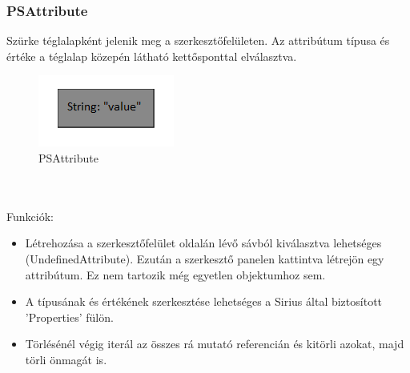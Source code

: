 \subsubsection{PSAttribute}
Szürke téglalapként jelenik meg a szerkesztőfelületen. Az attribútum típusa és értéke a téglalap közepén látható kettősponttal elválasztva.
\begin{figure}[!ht]
	\centering
	\includegraphics{figures/attr.PNG}
	\caption{PSAttribute}
	\label{attr} 
\end{figure}
\\\\
Funkciók:
\begin{itemize}  	
	\item Létrehozása a szerkesztőfelület oldalán lévő sávból kiválasztva lehetséges (UndefinedAttribute). Ezután a szerkesztő panelen kattintva létrejön egy attribútum. Ez nem tartozik még egyetlen objektumhoz sem.
	
	\item A típusának és értékének szerkesztése lehetséges a Sirius által biztosított 'Properties' fülön.
	
	\item Törlésénél végig iterál az összes rá mutató referencián és kitörli azokat, majd törli önmagát is.	

\end{itemize}

